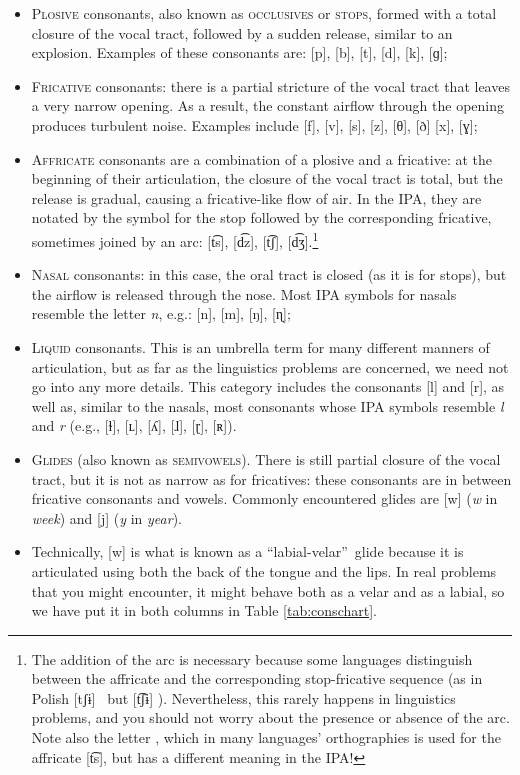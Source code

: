 \begin{refsection}
\begin{itemize}
    \item \textsc{Plosive} consonants, also known as \textsc{occlusives} or \textsc{stops}, formed with a total closure of the vocal tract, followed by a sudden release, similar to an explosion. Examples of these consonants are: [{p}], [{b}], [{t}], [{d}], [{k}], [{ɡ}];
    \item \textsc{Fricative} consonants: there is a partial stricture of the vocal tract that leaves a very narrow opening. As a result, the constant airflow through the opening produces turbulent noise. Examples include [{f}], [{v}], [{s}], [{z}], [{θ}], [{ð}] [{x}], [{ɣ}];
    \item \textsc{Affricate} consonants are a combination of a plosive and a fricative: at the beginning of their articulation, the closure of the vocal tract is total, but the release is gradual, causing a fricative-like flow of air. In the IPA, they are notated by the symbol for the stop followed by the corresponding fricative, sometimes joined by an arc: [{t͡s}], [{d͡z}], [{t͡ʃ}], [{d͡ʒ}].\footnote{The addition of the arc is necessary because some languages distinguish between the affricate and the corresponding stop-fricative sequence (as in Polish  [{tʃɨ}] \ but  [{t͡ʃɨ}] ). Nevertheless, this rarely happens in linguistics problems, and you should not worry about the presence or absence of the arc.
    Note also the letter , which in many languages' orthographies is used for the affricate [{t͡s}], but has a different meaning in the IPA!}
    \item \textsc{Nasal} consonants: in this case, the oral tract is closed (as it is for stops), but the airflow is released through the nose. Most IPA symbols for nasals resemble the letter \textit{n}, e.g.: [{n}], [{m}], [{ŋ}], [{ɳ}];
    \item \textsc{Liquid} consonants. This is an umbrella term for many different manners of articulation, but as far as the linguistics problems are concerned, we need not go into any more details. This category includes the consonants [{l}] and [{r}], as well as, similar to the nasals, most consonants whose IPA symbols resemble \textit{l} and \textit{r} (e.g., [{ɫ}], [{ʟ}], [{ʎ}], [{ɺ}], [{ɽ}], [{ʀ}]).
    \item \textsc{Glides} (also known as \textsc{semivowels}). There is still partial closure of the vocal tract, but it is not as narrow as for fricatives: these consonants are in between fricative consonants and vowels. Commonly encountered glides are [{w}] (\textit{w} in \textit{week}) and [{j}] (\textit{y} in \textit{year}).
    \item[] Technically, [{w}] is what is known as a “labial-velar”\ glide because it is articulated using both the back of the tongue and the lips. In real problems that you might encounter, it might behave both as a velar and as a labial, so we have put it in both columns in Table \ref{tab:conschart}.
    \end{itemize}


\end{refsection}
